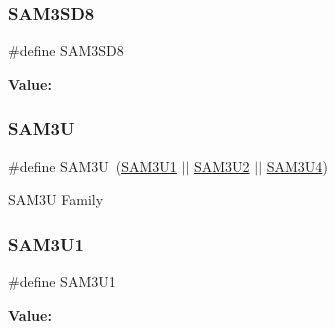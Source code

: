 \subsubsection{\texorpdfstring{SAM3SD8}{SAM3SD8}}
{\footnotesize\ttfamily \#define S\+A\+M3\+S\+D8}

{\bfseries Value\+:}
\begin{DoxyCode}{0}
\DoxyCodeLine{( \(\backslash\)}
\DoxyCodeLine{        )}

\end{DoxyCode}
\mbox{\label{group__sam__part__macros__group_ga987abac1ef39b0b447b8b11419942476}} 
\subsubsection{\texorpdfstring{SAM3U}{SAM3U}}
{\footnotesize\ttfamily \#define S\+A\+M3U~(\mbox{\hyperlink{group__sam__part__macros__group_gae39c5d03b1af93b2864e5f72908a0ff3}{S\+A\+M3\+U1}} $\vert$$\vert$ \mbox{\hyperlink{group__sam__part__macros__group_ga0feb884f39921517436f269c86914cb0}{S\+A\+M3\+U2}} $\vert$$\vert$ \mbox{\hyperlink{group__sam__part__macros__group_ga2af1cda107cbae1f393bce7a6c659a98}{S\+A\+M3\+U4}})}

S\+A\+M3U Family \mbox{\label{group__sam__part__macros__group_gae39c5d03b1af93b2864e5f72908a0ff3}} 
\subsubsection{\texorpdfstring{SAM3U1}{SAM3U1}}
{\footnotesize\ttfamily \#define S\+A\+M3\+U1}

{\bfseries Value\+:}
\begin{DoxyCode}{0}
\DoxyCodeLine{( \(\backslash\)}
\DoxyCodeLine{        )}

\end{DoxyCode}
\mbox{\label{group__sam__part__macros__group_ga0feb884f39921517436f269c86914cb0}} 
